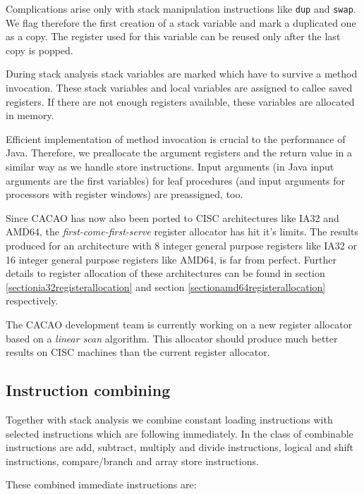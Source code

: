 Complications arise only with stack manipulation instructions like {\tt dup}
and {\tt swap}. We flag therefore the first creation of a stack variable and
mark a duplicated one as a copy. The register used for this variable can
be reused only after the last copy is popped.

During stack analysis stack variables are marked which have to survive a
method invocation. These stack variables and local variables are assigned
to callee saved registers. If there are not enough registers available,
these variables are allocated in memory.

Efficient implementation of method invocation is crucial to the performance
of Java. Therefore, we preallocate the argument registers and the return
value in a similar way as we handle store instructions. Input arguments (in
Java input arguments are the first variables) for leaf procedures (and
input arguments for processors with register windows) are preassigned, too.

Since CACAO has now also been ported to CISC architectures like IA32
and AMD64, the \textit{first-come-first-serve} register allocator has
hit it's limits. The results produced for an architecture with 8
integer general purpose registers like IA32 or 16 integer general
purpose registers like AMD64, is far from perfect. Further details to
register allocation of these architectures can be found in section
\ref{sectionia32registerallocation} and section
\ref{sectionamd64registerallocation} respectively.

The CACAO development team is currently working on a new register
allocator based on a \textit{linear scan} algorithm. This allocator
should produce much better results on CISC machines than the current
register allocator.


\subsection{Instruction combining}

Together with stack analysis we combine constant loading instructions
with selected instructions which are following immediately. In the
class of combinable instructions are add, subtract, multiply and
divide instructions, logical and shift instructions, compare/branch
and array store instructions.

These combined immediate instructions are:


